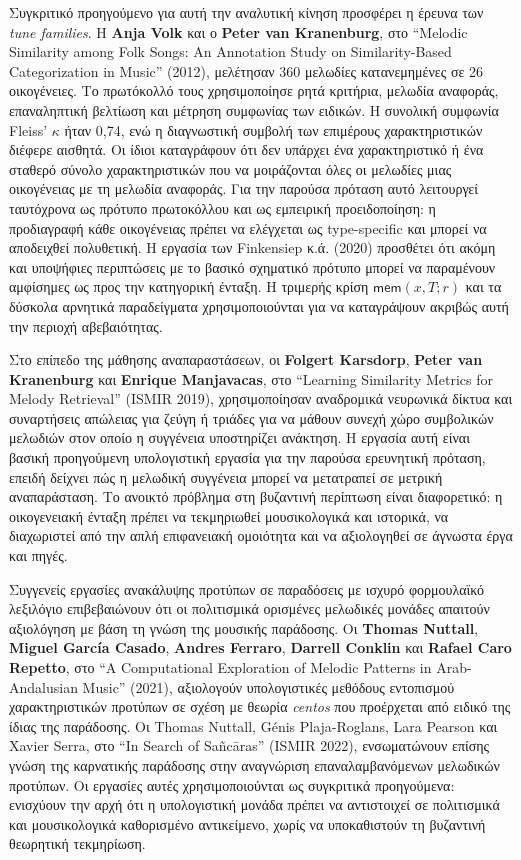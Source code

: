 \documentclass[11pt,a4paper]{article}
\begin{document}
Συγκριτικό προηγούμενο για αυτή την αναλυτική κίνηση προσφέρει η έρευνα των \emph{tune families}. Η \textbf{Anja Volk} και ο \textbf{Peter van Kranenburg}, στο ``Melodic Similarity among Folk Songs: An Annotation Study on Similarity-Based Categorization in Music'' (2012), μελέτησαν 360 μελωδίες κατανεμημένες σε 26 οικογένειες. Το πρωτόκολλό τους χρησιμοποίησε ρητά κριτήρια, μελωδία αναφοράς, επαναληπτική βελτίωση και μέτρηση συμφωνίας των ειδικών. Η συνολική συμφωνία Fleiss' $\kappa$ ήταν 0,74, ενώ η διαγνωστική συμβολή των επιμέρους χαρακτηριστικών διέφερε αισθητά. Οι ίδιοι καταγράφουν ότι δεν υπάρχει ένα χαρακτηριστικό ή ένα σταθερό σύνολο χαρακτηριστικών που να μοιράζονται όλες οι μελωδίες μιας οικογένειας με τη μελωδία αναφοράς. Για την παρούσα πρόταση αυτό λειτουργεί ταυτόχρονα ως πρότυπο πρωτοκόλλου και ως εμπειρική προειδοποίηση: η προδιαγραφή κάθε οικογένειας πρέπει να ελέγχεται ως type-specific και μπορεί να αποδειχθεί πολυθετική. Η εργασία των Finkensiep κ.ά. (2020) προσθέτει ότι ακόμη και υποψήφιες περιπτώσεις με το βασικό σχηματικό πρότυπο μπορεί να παραμένουν αμφίσημες ως προς την κατηγορική ένταξη. Η τριμερής κρίση $\mathsf{mem}(x,T;r)$ και τα δύσκολα αρνητικά παραδείγματα χρησιμοποιούνται για να καταγράψουν ακριβώς αυτή την περιοχή αβεβαιότητας.

Στο επίπεδο της μάθησης αναπαραστάσεων, οι \textbf{Folgert Karsdorp}, \textbf{Peter van Kranenburg} και \textbf{Enrique Manjavacas}, στο ``Learning Similarity Metrics for Melody Retrieval'' (ISMIR 2019), χρησιμοποίησαν αναδρομικά νευρωνικά δίκτυα και συναρτήσεις απώλειας για ζεύγη ή τριάδες για να μάθουν συνεχή χώρο συμβολικών μελωδιών στον οποίο η συγγένεια υποστηρίζει ανάκτηση. Η εργασία αυτή είναι βασική προηγούμενη υπολογιστική εργασία για την παρούσα ερευνητική πρόταση, επειδή δείχνει πώς η μελωδική συγγένεια μπορεί να μετατραπεί σε μετρική αναπαράσταση. Το ανοικτό πρόβλημα στη βυζαντινή περίπτωση είναι διαφορετικό: η οικογενειακή ένταξη πρέπει να τεκμηριωθεί μουσικολογικά και ιστορικά, να διαχωριστεί από την απλή επιφανειακή ομοιότητα και να αξιολογηθεί σε άγνωστα έργα και πηγές.

Συγγενείς εργασίες ανακάλυψης προτύπων σε παραδόσεις με ισχυρό φορμουλαϊκό λεξιλόγιο επιβεβαιώνουν ότι οι πολιτισμικά ορισμένες μελωδικές μονάδες απαιτούν αξιολόγηση με βάση τη γνώση της μουσικής παράδοσης. Οι \textbf{Thomas Nuttall}, \textbf{Miguel García Casado}, \textbf{Andres Ferraro}, \textbf{Darrell Conklin} και \textbf{Rafael Caro Repetto}, στο ``A Computational Exploration of Melodic Patterns in Arab-Andalusian Music'' (2021), αξιολογούν υπολογιστικές μεθόδους εντοπισμού χαρακτηριστικών προτύπων σε σχέση με θεωρία \emph{centos} που προέρχεται από ειδικό της ίδιας της παράδοσης. Οι Thomas Nuttall, Génis Plaja-Roglans, Lara Pearson και Xavier Serra, στο ``In Search of Sañcāras'' (ISMIR 2022), ενσωματώνουν επίσης γνώση της καρνατικής παράδοσης στην αναγνώριση επαναλαμβανόμενων μελωδικών προτύπων. Οι εργασίες αυτές χρησιμοποιούνται ως συγκριτικά προηγούμενα: ενισχύουν την αρχή ότι η υπολογιστική μονάδα πρέπει να αντιστοιχεί σε πολιτισμικά και μουσικολογικά καθορισμένο αντικείμενο, χωρίς να υποκαθιστούν τη βυζαντινή θεωρητική τεκμηρίωση.
\end{document}
